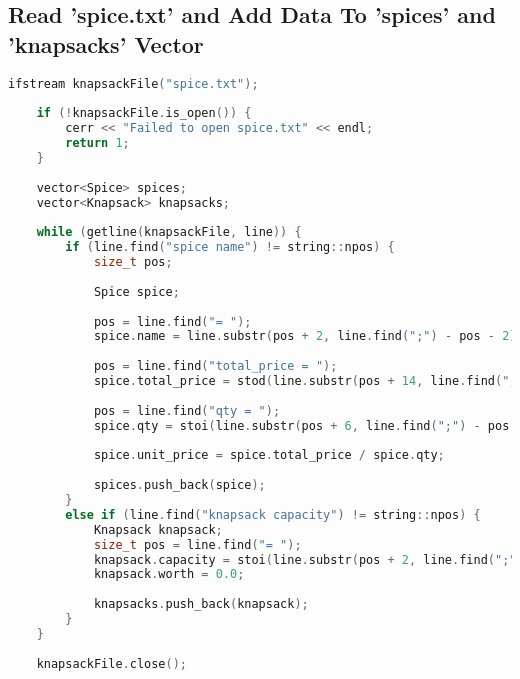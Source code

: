 \documentclass[letterpaper, 10pt,DIV=13]{scrartcl}
\numberwithin{equation}{section} %
\numberwithin{figure}{section} %
\numberwithin{table}{section} %
\begin{document}
\subsection{Read 'spice.txt' and Add Data To 'spices' and 'knapsacks' Vector}
\begin{linenumbers}
\begin{lstlisting}[language=C++, caption={Read 'spice.txt' and Add Data To 'spices' and 'knapsacks' Vector}, label={code:example}]
    ifstream knapsackFile("spice.txt");
    
    if (!knapsackFile.is_open()) {
        cerr << "Failed to open spice.txt" << endl;
        return 1;
    }
    
    vector<Spice> spices;
    vector<Knapsack> knapsacks;
    
    while (getline(knapsackFile, line)) {
        if (line.find("spice name") != string::npos) {
            size_t pos;
    
            Spice spice;
    
            pos = line.find("= ");
            spice.name = line.substr(pos + 2, line.find(";") - pos - 2);
    
            pos = line.find("total_price = ");
            spice.total_price = stod(line.substr(pos + 14, line.find(";") - pos - 14));
    
            pos = line.find("qty = ");
            spice.qty = stoi(line.substr(pos + 6, line.find(";") - pos - 6));
    
            spice.unit_price = spice.total_price / spice.qty;
    
            spices.push_back(spice);
        }
        else if (line.find("knapsack capacity") != string::npos) {
            Knapsack knapsack;
            size_t pos = line.find("= ");
            knapsack.capacity = stoi(line.substr(pos + 2, line.find(";") - pos - 2));
            knapsack.worth = 0.0;
    
            knapsacks.push_back(knapsack);
        }
    }
    
    knapsackFile.close();
\end{lstlisting}
\end{linenumbers}
\nolinenumbers
\end{document}
